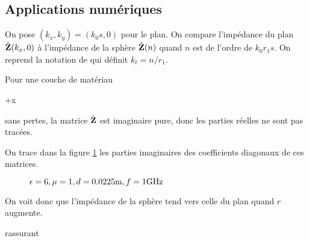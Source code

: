   \subsection{Applications numériques}
    On pose \((k_x,k_y) = (k_0 s, 0)\) pour le plan.
    On compare l'impédance du plan \(\hat{\mathbf{Z}}(k_x,0)\) à l'impédance de la sphère \(\hat{\mathbf{Z}}(n)\) quand \(n\) est de l'ordre de \(k_0r_1s\).
    On reprend la notation de \cite[p.~62]{hoppe_impedance_1995} qui définit \(k_t= n/r_1\).

    Pour une couche de matériau
\begin{REM}
  +x
\end{REM} 
     sans pertes, la matrice \(\hat{\mathbf{Z}}\) est imaginaire pure, donc les parties réelles ne sont pas tracées.

    On trace dans la figure \ref{fig:imp_fourier:sphere:hoppe_p62:converge_rayon} les parties imaginaires des coefficients diagonaux de ces matrices.

    \begin{figure}[!hbt]
      \centering
      
      \caption{\(\epsilon = 6, \mu = 1, d=0.0225\text{m}, f=1\text{GHz}\)}
      \label{fig:imp_fourier:sphere:hoppe_p62:converge_rayon}
    \end{figure}
     On voit donc que l'impédance de la sphère tend vers celle du plan quand \(r\) augmente.
\begin{REM}
  rassurant
\end{REM} 
